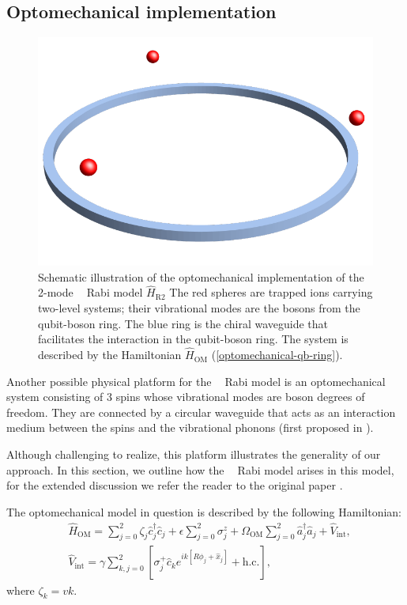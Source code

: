 \documentclass[reprint, aps, prx, amsmath, amssymb, longbibliography, superscriptaddress]{revtex4-2}
\DeclareMathOperator{\Zthree}{\mathbb{Z}_3}
\begin{document}
\subsection{Optomechanical implementation}
\label{optomechanical-implementation}

\begin{figure}
    \includegraphics[width=0.8\linewidth]{pics/optomechanical_Rabi_pic.pdf}
    \caption{Schematic illustration of the optomechanical implementation of the 2-mode $\Zthree$ Rabi model $\hat H_{\text{R}2}$ \cite{sedov_chiral_2020} The red spheres are trapped ions carrying two-level systems; their vibrational modes are the bosons from the qubit-boson ring. The blue ring is the chiral waveguide that facilitates the interaction in the qubit-boson ring. The system is described by the Hamiltonian $\hat H_{\text{OM}}$ (\ref{optomechanical-qb-ring}).}
    \label{fig:optomechanical-rabi}
\end{figure}

Another possible physical platform for the $\Zthree$ Rabi model is an optomechanical system consisting of 3 spins whose vibrational modes are boson degrees of freedom. They are connected by a circular waveguide that acts as an interaction medium between the spins and the vibrational phonons (first proposed in \cite{sedov_chiral_2020}). 

Although challenging to realize, this platform illustrates the generality of our approach. In this section, we outline how the $\Zthree$ Rabi model arises in this model, for the extended discussion we refer the reader to the original paper \cite{sedov_chiral_2020}. 

The optomechanical model in question is described by the following Hamiltonian:
\begin{equation}
\label{optomechanical-qb-ring}
\begin{aligned}
    &\hat{H}_{\text{OM}}=\sum\limits_{j=0}^2 \zeta_j \hat{c}_j^{\dagger} \hat{c}_j + 
 \epsilon \sum_{j=0}^2 \sigma_j^z + \Omega_{\text{OM}} \sum_{j=0}^2 \hat{a}_j^{\dagger} \hat{a}_j + \hat{V}_{\text{int}}, \\
    &\hat{V}_{\text{int}}=\gamma \sum_{k, j=0}^2 \left[\sigma_j^{+} \hat{c}_k e^{i k\left[R \phi_j+\hat x_j\right]}+\text {h.c.}\right] \text {, }
\end{aligned}   
\end{equation}
where $\zeta_k = v k$.
\end{document}
